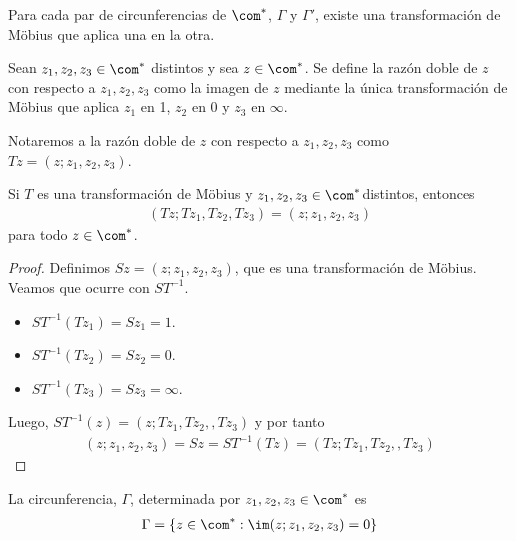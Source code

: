 \begin{cor}
Para cada par de circunferencias de $\com^*$, $\Gamma$ y $\Gamma'$, existe una transformación de M\"obius que aplica una en la otra.
\end{cor}

\begin{defi}
Sean $z_1,z_2,z_3 \in \com^*$ distintos y sea $z \in \com^*$. Se define la razón doble de $z$ con respecto a $z_1,z_2,z_3$ como la imagen de $z$ mediante la única transformación de M\"obius que aplica $z_1$ en 1, $z_2$ en 0 y $z_3$ en $\infty$.
\end{defi}
Notaremos a la razón doble de $z$ con respecto a $z_1,z_2,z_3$ como $Tz = (z;z_1,z_2,z_3)$.

\begin{prop}
Si $T$ es una transformación de M\"obius y $z_1,z_2,z_3 \in \com^*$distintos, entonces
\begin{align*}
    (Tz;Tz_1,Tz_2,Tz_3) = (z;z_1,z_2,z_3)
\end{align*}
para todo $z \in \com^*$.
\end{prop}

\begin{proof}
Definimos $Sz = (z;z_1,z_2,z_3)$, que es una transformación de M\"obius. Veamos que ocurre con $ST^{-1}$.
\begin{itemize}
    \item $ST^{-1}(Tz_1) = Sz_1 = 1$.
    \item $ST^{-1}(Tz_2) = Sz_2 = 0$.
    \item $ST^{-1}(Tz_3) = Sz_3 = \infty$.
\end{itemize}
Luego, $ST^{-1}(z) = (z;Tz_1,Tz_2,,Tz_3)$ y por tanto
\begin{align*}
    (z;z_1,z_2,z_3) = Sz = ST^{-1}(Tz) = (Tz;Tz_1,Tz_2,,Tz_3)
\end{align*}
\end{proof}

\begin{obs}
La circunferencia, $\Gamma$, determinada por $z_1,z_2,z_3 \in \com^*$ es
\begin{align*}
    \Gamma = \{ z \in \com^* : \im(z;z_1,z_2,z_3) = 0 \}
\end{align*}
\end{obs}

